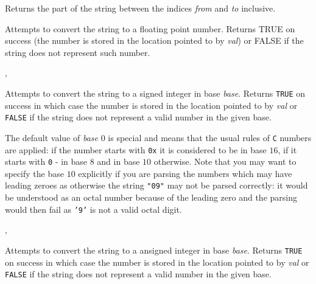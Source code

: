 Returns the part of the string between the indices {\it from} and {\it to}
inclusive.

\label{wxstringtodouble}


Attempts to convert the string to a floating point number. Returns TRUE on
success (the number is stored in the location pointed to by {\it val}) or FALSE
if the string does not represent such number.


,\\

\label{wxstringtolong}


Attempts to convert the string to a signed integer in base {\it base}. Returns
{\tt TRUE} on success in which case the number is stored in the location
pointed to by {\it val} or {\tt FALSE} if the string does not represent a
valid number in the given base.

The default value of {\it base} $0$ is special and means that the usual rules
of {\tt C} numbers are applied: if the number starts with {\tt 0x} it is
considered to be in base $16$, if it starts with {\tt 0} - in base $8$ and in
base $10$ otherwise. Note that you may want to specify the base $10$ explicitly
if you are parsing the numbers which may have leading zeroes as otherwise the
string {\tt "09"} may not be parsed correctly: it would be understood as an
octal number because of the leading zero and the parsing would then fail as 
{\tt '9'} is not a valid octal digit.


,\\

\label{wxstringtoulong}


Attempts to convert the string to a ansigned integer in base {\it base}.
Returns {\tt TRUE} on success in which case the number is stored in the
location pointed to by {\it val} or {\tt FALSE} if the string does not
represent a valid number in the given base.

